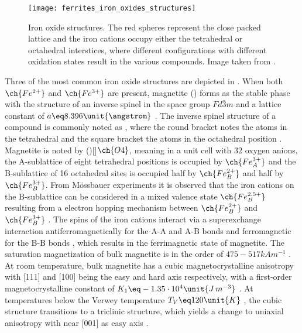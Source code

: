 \documentclass[\main/dresen_thesis.tex]{subfiles}
\begin{document}
  \begin{figure}[b]
    \centering
    \texttt{[image: ferrites\_iron\_oxides\_structures]}
    \caption{\label{fig:theoreticalBackground:ferrites:ironOxides}Iron oxide structures. The red spheres represent the close packed  lattice and the iron cations occupy either the tetrahedral or octahedral interstices, where different configurations with different oxidation states result in the various compounds. Image taken from  \cite{Parkinson_2016_Irono}.}
  \end{figure}
  Three of the most common iron oxide structures are depicted in .
  When both $\ch{Fe^{2+}}$ and $\ch{Fe^{3+}}$ are present, magnetite () forms as the stable phase with the structure of an inverse spinel in the space group $Fd\bar{3}m$ and a lattice constant of $a \eq 8.396 \unit{\angstrom}$ \cite{Cornell_2003_Their}.
  The inverse spinel structure of a compound  is commonly noted as , where the round bracket notes the atoms in the tetrahedral and the square bracket the atoms in the octahedral position \cite{Sickafus_1999_Struc}.
  Magnetite is noted by ()[]$\ch{O4}$, meaning in a unit cell with $32$ oxygen anions, the A-sublattice of eight tetrahedral positions is occupied by $\ch{Fe^{3+}_A}$ and the B-sublattice of 16 octahedral sites is occupied half by $\ch{Fe^{2+}_B}$ and half by $\ch{Fe^{3+}_B}$.
  From M\"ossbauer experiments it is observed that the iron cations on the B-sublattice can be considered in a mixed valence state $\ch{Fe^{2.5+}_B}$ resulting from a electron hopping mechanism between $\ch{Fe^{2+}_B}$ and $\ch{Fe^{3+}_B}$ \cite{Cornell_2003_Their}.
  The spins of the iron cations interact via a superexchange interaction antiferromagnetically for the A-A and A-B bonds and ferromagnetic for the B-B bonds \cite{Mazozuluaga_2007_Surfa}, which results in the ferrimagnetic state of magnetite.
  The saturation magnetization of bulk magnetite is in the order of $475 - 517 \unit{kA m^{-1}}$ \cite{Cornell_2003_Their, Handley_2000_Moder}.
  At room temperature, bulk magnetite has a cubic magnetocrystalline anisotropy with [111] and [100] being the easy and hard axis respectively, with a first-order magnetocrystalline constant of $K_1 \eq -1.35 \cdot 10^{4} \unit{J\, m^{-3}}$ \cite{Goya_2003_Stati}.
  At temperatures below the Verwey temperature $T_V \eq 120 \unit{K}$ \cite{Bickford_1957_Magne}, the cubic structure transitions to a triclinic structure, which yields a change to uniaxial anisotropy with near [001] as easy axis \cite{Medrano_1999_Domai}.
\end{document}
